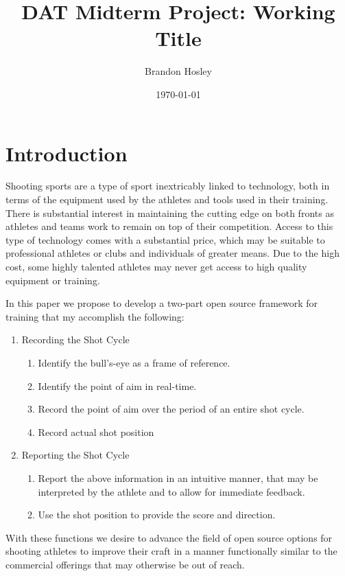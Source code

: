 \documentclass[conference]{IEEEtran}
\title{DAT Midterm Project: Working Title}
\author{Brandon Hosley}
\date{\today}
\begin{document}
	\maketitle
	
\begin{abstract}
\end{abstract}

\section{Introduction}

Shooting sports are a type of sport inextricably linked to technology, 
both in terms of the equipment used by the athletes and tools used in their training.
There is substantial interest in maintaining the cutting edge on both fronts as athletes and teams work to remain on top of their competition.
Access to this type of technology comes with a substantial price, which may be suitable to professional athletes or clubs and individuals of greater means.
Due to the high cost, some highly talented athletes may never get access to high quality equipment or training.

In this paper we propose to develop a two-part open source framework for training that my accomplish the following:

\begin{enumerate}
	\item Recording the Shot Cycle
	\begin{enumerate}
		\item Identify the bull's-eye as a frame of reference.
		\item Identify the point of aim in real-time.
		\item Record the point of aim over the period of an entire shot cycle.
		\item Record actual shot position
	\end{enumerate}
	\item Reporting the Shot Cycle
	\begin{enumerate}
		\item Report the above information in an intuitive manner, that may be interpreted by the athlete and to allow for immediate feedback.
		\item Use the shot position to provide the score and direction.
	\end{enumerate}
\end{enumerate}

With these functions we desire to advance the field of open source options for shooting athletes to improve their craft in a manner functionally similar to the commercial offerings \cite{scatt, noptel} that may otherwise be out of reach.
\end{document}
